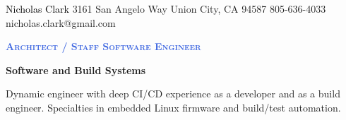 \documentclass[letterpaper, 10pt]{article}
\newcommand{\NrcColorName}{Black}
\newcommand{\NrcColorTitle}{RoyalBlue}
\begin{document}
%
\nrctitle
{\textcolor{\NrcColorName}{Nicholas Clark}}
{3161 San Angelo Way}
{Union City, CA 94587}
{805-636-4033}
{nicholas.clark@gmail.com}
%
\begin{center}\par\smallskip
\textcolor{\NrcColorTitle}{\Large \textbf{\textsc{Architect / Staff Software Engineer}}}\par
\large \textbf{{Software and Build Systems}}\par
\smallskip
\noindent \begin{minipage}[t]{0.75\textwidth}%
\begin{center}
Dynamic engineer with deep CI/CD experience as a developer and as a build
engineer. Specialties in embedded Linux firmware and build/test automation.
\end{center}
\end{minipage}
\end{center}
\par \smallskip \smallskip
%
%
\end{document}
